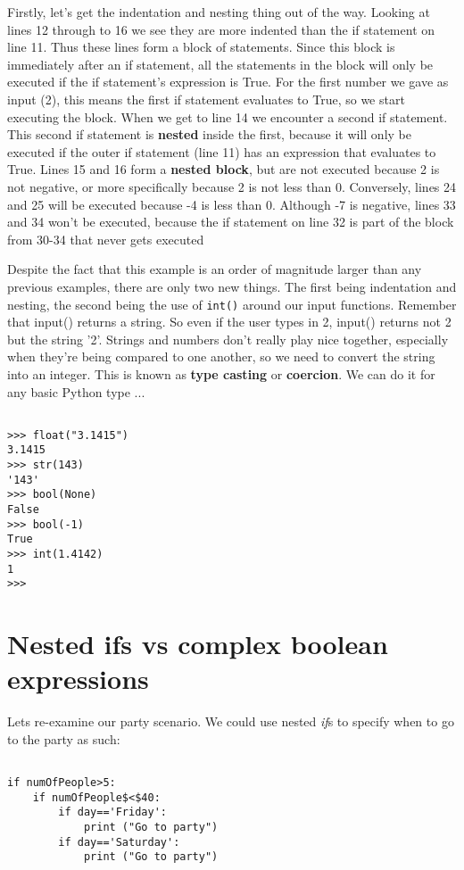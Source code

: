 Firstly, let's get the indentation and nesting thing out of the way.   Looking at lines 12 through to 16 we see they are more indented than   the if statement on line 11. Thus these lines form a block of   statements. Since this block is immediately after an if statement, all   the statements in the block will only be executed if the if statement's   expression is True. For the first number we gave as input (2), this means the first                 if statement evaluates to True, so we start executing the block. When we get to line 14 we   encounter a second if statement. This second if statement is   \textbf{nested} inside the first, because it will only be   executed if the outer if statement (line 11) has an expression that   evaluates to True. Lines 15 and 16 form a \textbf{nested   block}, but are not executed because 2 is not negative, or more   specifically because 2 is not less than 0. Conversely, lines 24 and 25   will be executed because -4 is less than 0. Although -7 is negative, lines 33 and 34 won't be executed, because the if statement on line 32 is part of the block from 30-34 that never gets executed

Despite the fact that this example is an order of magnitude larger   than any previous examples, there are only two new things. The first   being indentation and nesting, the second being the use of   
\texttt{int()} around our input functions.  Remember that   input() returns a string. So even if the user types in 2,   input() returns not 2 but the string '2'. Strings and numbers don't   really play nice together, especially when they're being compared to   one another, so we need to convert the string into an integer. This is   known as \textbf{type casting} or \textbf{coercion}. We   can do it for any basic Python type ...
\begin{lstlisting}

>>> float("3.1415")
3.1415
>>> str(143)
'143'
>>> bool(None)
False
>>> bool(-1)
True
>>> int(1.4142)
1
>>>
\end{lstlisting}

\section{Nested ifs vs complex boolean expressions}

 Lets re-examine our party scenario. We could use nested \textit{if}s to specify when to go to the party as such:
\begin{lstlisting}

if numOfPeople>5:
	if numOfPeople$<$40:
		if day=='Friday':
			print ("Go to party")
		if day=='Saturday':
			print ("Go to party")
		\end{lstlisting}

